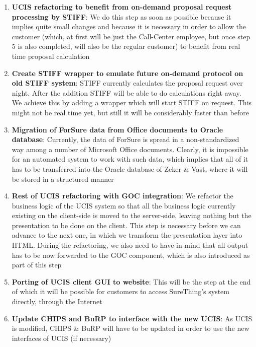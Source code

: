 \begin{enumerate}

\item \textbf{UCIS refactoring to benefit from on-demand proposal request
processing by STIFF}: We do this step as soon as possible because it
implies quite small changes and because it is necessary in order
to allow the customer (which, at first will be just the Call-Center
employee, but once step 5 is also completed, will also be the regular
customer) to benefit from real time proposal calculation

\item \textbf{Create STIFF wrapper to emulate future on-demand protocol
on old STIFF system}: STIFF currently calculates the proposal request
over night. After the addition STIFF will be able to do calculations
right away. We achieve this by adding a wrapper which will start
STIFF on request. This might not be real time yet, but still it will be
considerably faster than before

\item \textbf{Migration of ForSure data from Office documents to Oracle database}:
Currently, the data of ForSure is spread in a non-standardized
way among a number of Microsoft Office documents. Clearly, it is
impossible for an automated system to work with such data, which
implies that all of it has to be transferred into the Oracle database
of Zeker \& Vast, where it will be stored in a structured manner

\item \textbf{Rest of UCIS refactoring with GOC integration}: We refactor the
business logic of the UCIS system so that all the business logic currently
existing on the client-side is moved to the server-side, leaving nothing
but the presentation to be done on the client. This step is necessary
before we can advance to the next one, in which we transform
the presentation layer into HTML. During the refactoring, we also need
to have in mind that all output has to be now forwarded to the GOC
component, which is also introduced as part of this step

\item \textbf{Porting of UCIS client GUI to website}: This will be the step
at the end of which it will be possible for customers to access SureThing's
system directly, through the Internet

\item \textbf{Update CHIPS and BuRP to interface with the new UCIS}: As UCIS
is modified, CHIPS \& BuRP will have to be updated in order to use the
new interfaces of UCIS (if necessary)


\end{enumerate}

